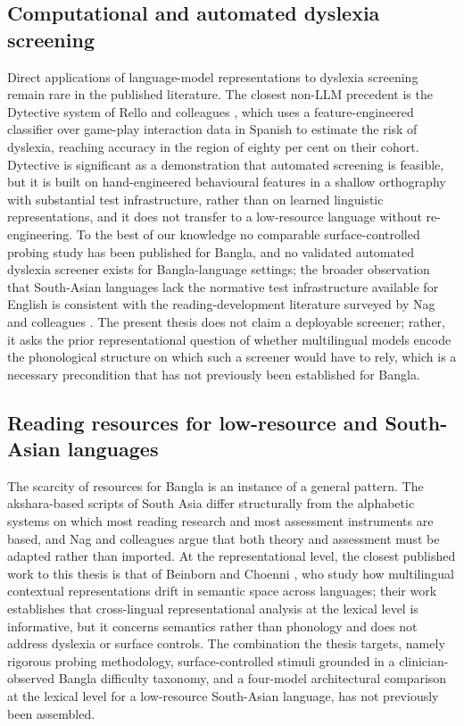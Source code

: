 \subsection{Computational and automated dyslexia screening}

Direct applications of language-model representations to dyslexia screening remain rare in the published literature. The closest non-LLM precedent is the Dytective system of Rello and colleagues \cite{rello2016dytective}, which uses a feature-engineered classifier over game-play interaction data in Spanish to estimate the risk of dyslexia, reaching accuracy in the region of eighty per cent on their cohort. Dytective is significant as a demonstration that automated screening is feasible, but it is built on hand-engineered behavioural features in a shallow orthography with substantial test infrastructure, rather than on learned linguistic representations, and it does not transfer to a low-resource language without re-engineering. To the best of our knowledge no comparable surface-controlled probing study has been published for Bangla, and no validated automated dyslexia screener exists for Bangla-language settings; the broader observation that South-Asian languages lack the normative test infrastructure available for English is consistent with the reading-development literature surveyed by Nag and colleagues \cite{nag2014dyslexia,nag2017indian}. The present thesis does not claim a deployable screener; rather, it asks the prior representational question of whether multilingual models encode the phonological structure on which such a screener would have to rely, which is a necessary precondition that has not previously been established for Bangla.

\subsection{Reading resources for low-resource and South-Asian languages}

The scarcity of resources for Bangla is an instance of a general pattern. The akshara-based scripts of South Asia differ structurally from the alphabetic systems on which most reading research and most assessment instruments are based, and Nag and colleagues \cite{nag2014dyslexia,nag2017indian} argue that both theory and assessment must be adapted rather than imported. At the representational level, the closest published work to this thesis is that of Beinborn and Choenni \cite{beinborn2019semantic}, who study how multilingual contextual representations drift in semantic space across languages; their work establishes that cross-lingual representational analysis at the lexical level is informative, but it concerns semantics rather than phonology and does not address dyslexia or surface controls. The combination the thesis targets, namely rigorous probing methodology, surface-controlled stimuli grounded in a clinician-observed Bangla difficulty taxonomy, and a four-model architectural comparison at the lexical level for a low-resource South-Asian language, has not previously been assembled.

